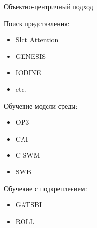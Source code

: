 \begin{frame}{Объектно-центричный подход}
\begin{minipage}[t]{0.48\linewidth}
    \begin{tcolorbox}
        Поиск представления:
        \begin{itemize}
            \item Slot Attention
            \item GENESIS
            \item IODINE
            \item etc.
        \end{itemize}
    \end{tcolorbox}
    
    \begin{tcolorbox}
        Обучение модели среды:
        \begin{itemize}
            \item OP3
    		\item CAI {\color{gray} \cite{CAI}}
    		\item C-SWM
    		\item SWB
        \end{itemize}
    \end{tcolorbox}
\end{minipage}
\hfill
\begin{minipage}[t]{0.48\linewidth}
    \begin{tcolorbox}
        Обучение с подкреплением:
        \begin{itemize}
    		\item GATSBI {\color{gray} \cite{GATSBI}}
    		\item ROLL {\color{gray} \cite{ROLL}}
        \end{itemize}
    \end{tcolorbox}
\end{minipage}
\end{frame}